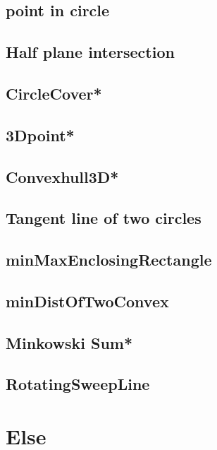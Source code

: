 \subsection{point in circle}

\subsection{Half plane intersection}

\subsection{CircleCover*} %

\subsection{3Dpoint*} %

\subsection{Convexhull3D*} %

\subsection{Tangent line of two circles}

\subsection{minMaxEnclosingRectangle}

\subsection{minDistOfTwoConvex}

\subsection{Minkowski Sum*} %

\subsection{RotatingSweepLine}


\section{Else}
